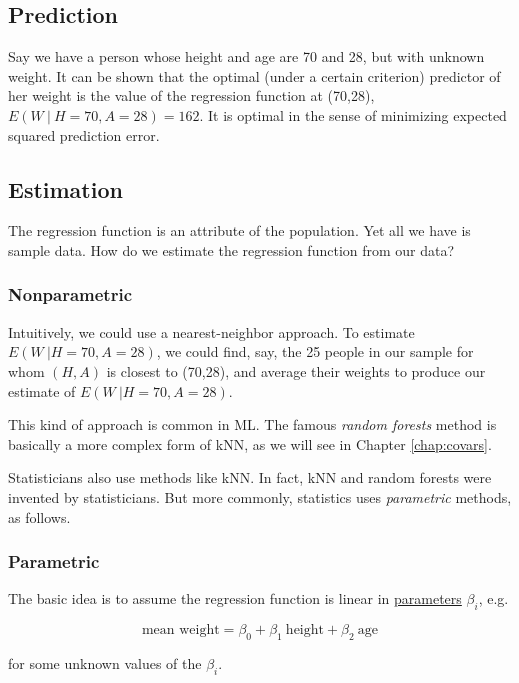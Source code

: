 \subsection{Prediction}

Say we have a person whose height and age are 70 and 28, but with
unknown weight.  It can be shown that the optimal (under a certain
criterion) predictor of her weight is the value of the regression
function at (70,28), $E(W ~|~ H=70, A=28) = 162$.  It is optimal
in the sense of minimizing expected squared prediction error.

\subsection{Estimation}

The regression function is an attribute of the population.  Yet all we
have is sample data.  How do we estimate the regression function from
our data?

\subsubsection{Nonparametric}

Intuitively, we could use a nearest-neighbor approach.  To estimate
$E(W ~| H=70, A=28)$, we could find, say, the 25 people in our
sample for whom $(H,A)$ is closest to (70,28), and average their weights
to produce our estimate of $E(W ~| H=70, A=28)$.  

This kind of approach is common in ML.  The famous \textit{random
forests} method is basically a more complex form of kNN, as we will see
in Chapter \ref{chap:covars}.  

Statisticians also use methods like kNN.  In fact, kNN and random
forests were invented by statisticians.  But more commonly, statistics
uses \textit{parametric} methods, as follows.

\subsubsection{Parametric}

The basic idea is to assume the regression function is linear in
\underline{parameters} $\beta_i$, e.g.

\begin{equation}
\label{wthtage}
\textrm{mean weight} = \beta_0 + \beta_1 ~ \textrm{height} + \beta_2 ~ \textrm{age}
\end{equation}

for some unknown values of the $\beta_i$.

